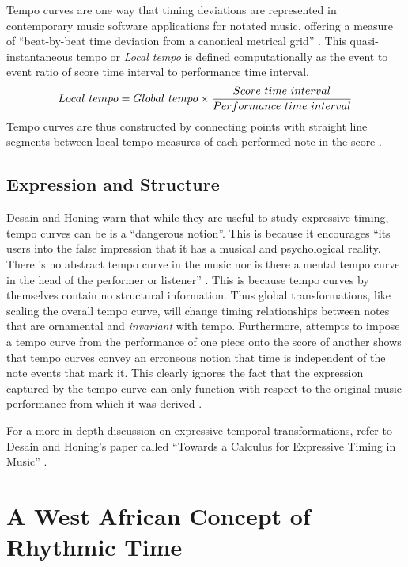 Tempo curves are one way that timing deviations are represented in
contemporary music software applications for notated music, offering 
a measure of ``beat-by-beat time deviation from a canonical metrical grid'' \cite[p. 39]{Smith:99}.
This quasi-instantaneous tempo or {\it Local tempo} is defined
computationally as the event to event ratio of score time interval
to performance time interval. $$ Local\ tempo = Global \ tempo \times {Score \ time \ interval
  \over Performance \ time \ interval}$$ Tempo curves are thus 
constructed by connecting points with straight line segments between local
tempo measures of each performed note in the score \cite{Smith:99}\cite{Desain:91}.

\vspace{5mm}
\subsection{Expression and Structure}

Desain and Honing warn that while they are useful to study expressive
timing, tempo curves can be is a ``dangerous notion''. This is because
it encourages ``its users into the false impression that it has a musical and
psychological reality. There is no abstract tempo curve in the music
nor is there a mental tempo curve in the head of the performer or
listener'' \cite{Desain:91}. This is because tempo curves by themselves
contain no structural information. Thus global transformations, like 
scaling the overall tempo curve, will change timing relationships 
between notes that are ornamental and {\it invariant} with tempo. 
Furthermore, attempts to impose a tempo curve from the performance of 
one piece onto the score of another shows that tempo curves convey an 
erroneous notion that time is independent of the note events that mark it.
This clearly ignores the fact that the expression captured by the
tempo curve can only function with respect to the original
music performance from which it was derived \cite{Smith:99}\cite{Desain:91}\cite{Desain:91towards}. 

For a more in-depth discussion on expressive temporal transformations,
refer to Desain and Honing's paper called ``Towards a Calculus for 
Expressive Timing in Music'' \cite{Desain:91towards}. 


\vspace{7mm}
\section{A West African Concept of Rhythmic Time}
\vspace{3mm}


